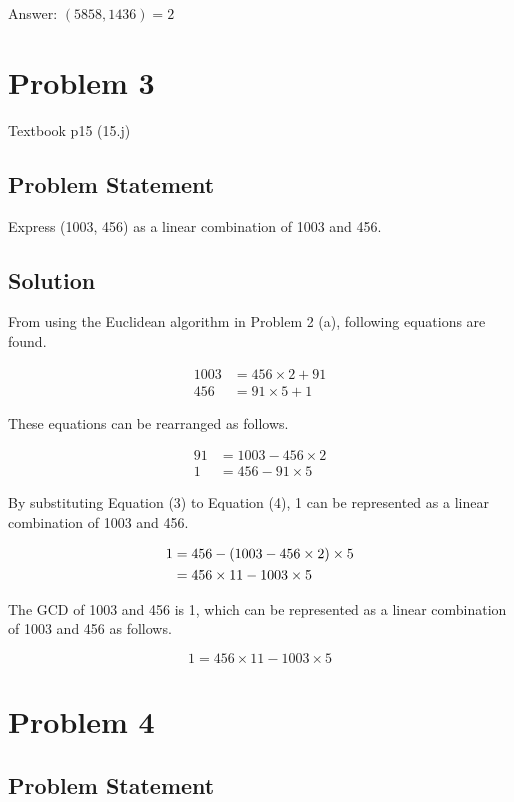 \documentclass{article}
\begin{document}
Answer: $(5858, 1436) = 2$

\section*{Problem 3}

Textbook p15 (15.j)

\subsection*{Problem Statement}

Express (1003, 456) as a linear combination of 1003 and 456.

\subsection*{Solution}

From using the Euclidean algorithm in Problem 2 (a), following equations are found.

\begin{align}
	1003 & = 456 \times 2 + 91 \\
	456  & = 91 \times 5 + 1
\end{align}

These equations can be rearranged as follows.

\begin{align}
	91 & = 1003 - 456 \times 2 \\
	1  & = 456 - 91 \times 5
\end{align}

By substituting Equation (3) to Equation (4), 1 can be represented as a linear combination of 1003 and 456.

\begin{align}
	1 & = 456 - (1003 - 456 \times 2) \times 5 \notag \\
	  & = 456 \times 11 - 1003 \times 5
\end{align}

The GCD of 1003 and 456 is 1, which can be represented as a linear combination of 1003 and 456 as follows.

$$
	1 = 456 \times 11 - 1003 \times 5
$$

\section*{Problem 4}

\subsection*{Problem Statement}
\end{document}
